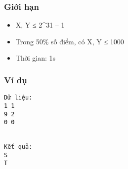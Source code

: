 \subsubsection{   Giới hạn  }
\begin{itemize}
	\item     X, Y ≤ 2^31 – 1   
	\item     Trong 50\% số điểm, có X, Y ≤ 1000   
	\item     Thời gian: 1s   
\end{itemize}

\subsubsection{   Ví dụ  }
\begin{verbatim}
Dữ liệu:
1 1
9 2
0 0


Kết quả:
S
T

\end{verbatim}
